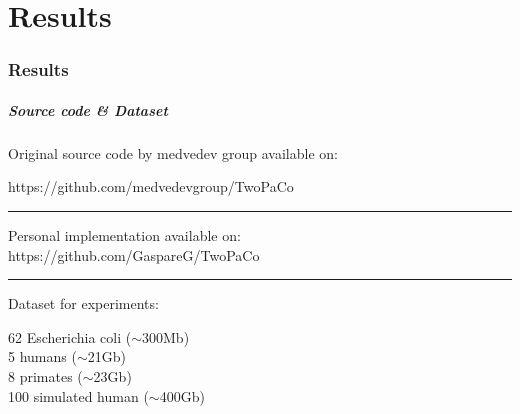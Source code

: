 \part{Results}
\section{Results}

\begin{frame}
	\partpage
	\centering
\end{frame}


\begin{frame}
	\frametitle{Source code \& Dataset}
	\centering
	
	Original source code by medvedev group available on:\\
	
	\medskip
	
	https://github.com/medvedevgroup/TwoPaCo \\
	
	\medskip
  \noindent\rule{4cm}{0.4pt}
	\medskip
	
	Personal implementation available on:\\
	\medskip
	https://github.com/GaspareG/TwoPaCo
	
	\medskip
  \noindent\rule{4cm}{0.4pt}
	\medskip
		
	Dataset for experiments:

	\medskip
	
	62 Escherichia coli ($\sim$300Mb)\\
	5 humans ($\sim$21Gb)\\
  8 primates ($\sim$23Gb)\\
  100 simulated human ($\sim$400Gb)
	
	
\end{frame}


